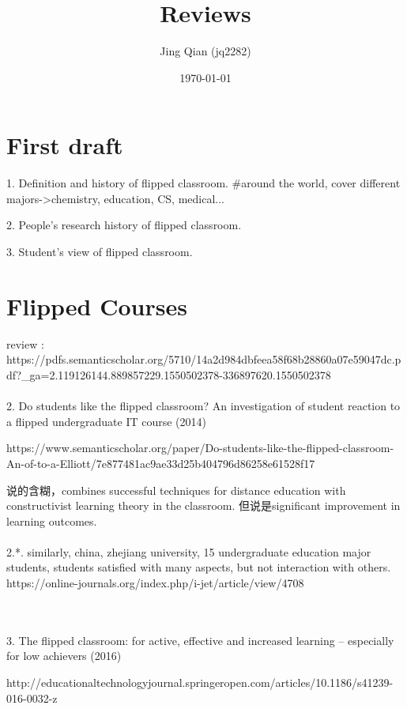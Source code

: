 \documentclass[onecolumn,aps,prd,groupedaddress,nofootinbib,notitlepage,12pt]{revtex4-1}
\begin{document}
\title{Reviews}

\author{Jing Qian (jq2282)}

\date{\today}

\maketitle
\section{First draft}
1. Definition and history of flipped classroom.
#around the world, cover different majors->chemistry, education, CS, medical...

2. People's research history of flipped classroom.

3. Student's view of flipped classroom.


\section{Flipped Courses}
review :
https://pdfs.semanticscholar.org/5710/14a2d984dbfeea58f68b28860a07e59047dc.pdf?_ga=2.119126144.889857229.1550502378-336897620.1550502378
\\\\
2. Do students like the flipped classroom? An investigation of student reaction to a flipped undergraduate IT course (2014)

https://www.semanticscholar.org/paper/Do-students-like-the-flipped-classroom-An-of-to-a-Elliott/7e877481ac9ae33d25b404796d86258e61528f17

说的含糊，combines successful techniques for distance education with constructivist learning theory in the classroom. 但说是significant improvement in learning outcomes.
\\\\
2.*. similarly, china, zhejiang university, 15 undergraduate education major students,  students satisfied with many aspects, but not interaction with others. https://online-journals.org/index.php/i-jet/article/view/4708

\\\\
3. The flipped classroom: for active, effective and increased learning – especially for low achievers (2016)

http://educationaltechnologyjournal.springeropen.com/articles/10.1186/s41239-016-0032-z
\end{document}
